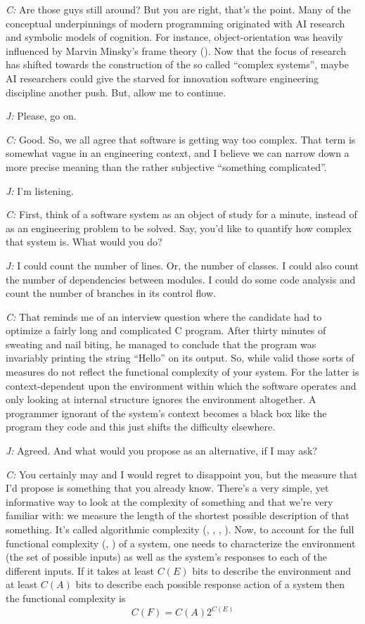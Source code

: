 \documentclass[10pt]{sigplanconf}
\begin{document}
\emph{C:} Are those guys still around? But you are right, that's the point. Many of the conceptual underpinnings of modern programming originated with AI research and symbolic models of cognition. For instance, object-orientation was heavily influenced by Marvin Minsky's frame theory (\cite{minsky}). Now that the focus of research has shifted towards the construction of the so called ``complex systems'', maybe AI researchers could give the starved for innovation software engineering discipline another push. But, allow me to continue. 

\emph{J:} Please, go on.

\emph{C:} Good. So, we all agree that software is getting way too complex. That term is somewhat vague in an engineering context, and I believe we can narrow down a more precise meaning than the rather subjective ``something complicated''.

\emph{J:} I'm listening.

\emph{C:} First, think of a software system as an object of study for a minute, instead of as an engineering problem to be solved. Say, you'd like to quantify how complex that system is. What would you do?

\emph{J:} I could count the number of lines. Or, the number of classes. I could also count the number of dependencies between modules. I could do some code analysis and count the number of branches in its control flow. 

\emph{C:} That reminds me of an interview question where the candidate had to optimize a fairly long and complicated C program. After thirty minutes of sweating and nail biting, he managed to conclude that the program was invariably printing the string ``Hello'' on its output. So, while valid those sorts of measures do not reflect the functional complexity of your system. For the latter is context-dependent upon the environment within which the software operates and only looking at internal structure ignores the environment altogether. A programmer ignorant of the system's context becomes a black box like the program they code and this just shifts the difficulty elsewhere.

\emph{J:} Agreed. And what would you propose as an alternative, if I may ask?

\emph{C:} You certainly may and I would regret to disappoint you, but the measure that I'd propose is something that you already know. There's a very simple, yet informative way to look at the complexity of something and that we're very familiar with: we measure the length of the shortest possible description of that something. It's called algorithmic complexity (\cite{solomonoff}, \cite{kolmogorov}, \cite{chaitin1}, \cite{chaitin2}). Now, to account for the full functional complexity (\cite{baryam:1}, \cite{baryam:4}) of a system, one needs to characterize the environment (the set of possible inputs) as well as the system's responses to each of the different inputs. If it takes at least $C(E)$ bits to describe the environment and at least $C(A)$ bits to describe each possible response action of a system then the functional complexity is
\begin{displaymath}
C(F)=C(A)2^{C(E)}
\end{displaymath}
\end{document}
